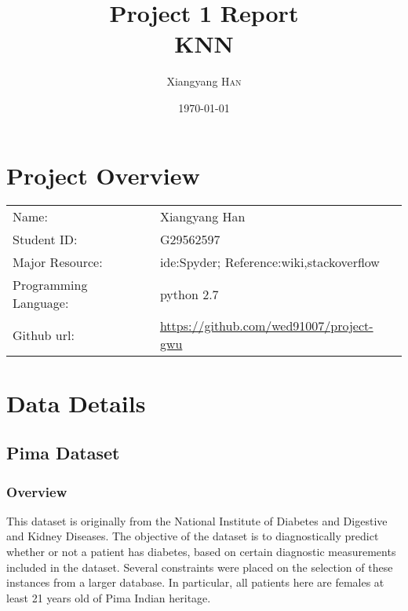 \documentclass{article}
\title{Project 1 Report \\ KNN} %
\author{Xiangyang \textsc{Han}} %
\date{\today} %
\begin{document}
\maketitle %



\section{Project Overview}


\begin{tabular}{ll}
Name:&Xiangyang Han\\
Student ID:&G29562597\\
Major Resource:&ide:Spyder; Reference:wiki,stackoverflow\\
Programming Language:&python 2.7\\
Github url:&\url{https://github.com/wed91007/project-gwu}
\end{tabular}




 

\section{Data Details}

\subsection{Pima Dataset}
\subsubsection{Overview}
This dataset is originally from the National Institute of Diabetes and Digestive and Kidney Diseases. The objective of the dataset is to diagnostically predict whether or not a patient has diabetes, based on certain diagnostic measurements included in the dataset. Several constraints were placed on the selection of these instances from a larger database. In particular, all patients here are females at least 21 years old of Pima Indian heritage.
\end{document}
